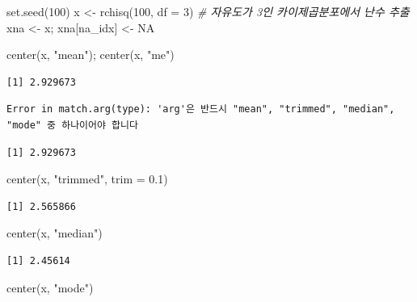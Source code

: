 \documentclass[
  11pt,
]{krantz}
\newenvironment{Shaded}{\begin{snugshade}}{\end{snugshade}}
\newcommand{\AttributeTok}[1]{\textcolor[rgb]{0.61,0.61,0.61}{#1}}
\newcommand{\CommentTok}[1]{\textcolor[rgb]{0.37,0.37,0.37}{\textit{#1}}}
\newcommand{\ConstantTok}[1]{\textcolor[rgb]{0,0,0}{#1}}
\newcommand{\DecValTok}[1]{\textcolor[rgb]{0.06,0.06,0.06}{#1}}
\newcommand{\FloatTok}[1]{\textcolor[rgb]{0.06,0.06,0.06}{#1}}
\newcommand{\FunctionTok}[1]{\textcolor[rgb]{0,0,0}{#1}}
\newcommand{\NormalTok}[1]{#1}
\newcommand{\OtherTok}[1]{\textcolor[rgb]{0.37,0.37,0.37}{#1}}
\newcommand{\StringTok}[1]{\textcolor[rgb]{0.5,0.5,0.5}{#1}}
\begin{document}
\begin{Shaded}
\begin{Highlighting}[]
\FunctionTok{set.seed}\NormalTok{(}\DecValTok{100}\NormalTok{)}
\NormalTok{x }\OtherTok{\textless{}{-}} \FunctionTok{rchisq}\NormalTok{(}\DecValTok{100}\NormalTok{, }\AttributeTok{df =} \DecValTok{3}\NormalTok{) }\CommentTok{\# 자유도가 3인 카이제곱분포에서 난수 추출}
\NormalTok{xna }\OtherTok{\textless{}{-}}\NormalTok{ x; xna[na\_idx] }\OtherTok{\textless{}{-}} \ConstantTok{NA}


\FunctionTok{center}\NormalTok{(x, }\StringTok{"mean"}\NormalTok{); }\FunctionTok{center}\NormalTok{(x, }\StringTok{"me"}\NormalTok{)}
\end{Highlighting}
\end{Shaded}

\begin{verbatim}
[1] 2.929673
\end{verbatim}

\begin{verbatim}
Error in match.arg(type): 'arg'은 반드시 "mean", "trimmed", "median", "mode" 중 하나이어야 합니다
\end{verbatim}

\begin{verbatim}
[1] 2.929673
\end{verbatim}

\begin{Shaded}
\begin{Highlighting}[]
\FunctionTok{center}\NormalTok{(x, }\StringTok{"trimmed"}\NormalTok{, }\AttributeTok{trim =} \FloatTok{0.1}\NormalTok{)}
\end{Highlighting}
\end{Shaded}

\begin{verbatim}
[1] 2.565866
\end{verbatim}

\begin{Shaded}
\begin{Highlighting}[]
\FunctionTok{center}\NormalTok{(x, }\StringTok{"median"}\NormalTok{)}
\end{Highlighting}
\end{Shaded}

\begin{verbatim}
[1] 2.45614
\end{verbatim}

\begin{Shaded}
\begin{Highlighting}[]
\FunctionTok{center}\NormalTok{(x, }\StringTok{"mode"}\NormalTok{)}
\end{Highlighting}
\end{Shaded}
\end{document}
